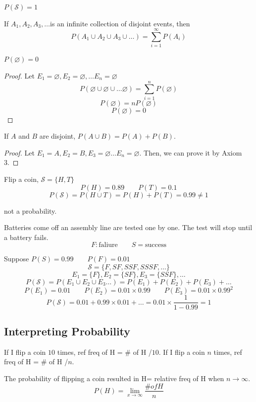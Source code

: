 \begin{axio}
  $P(\mathcal{S})=1$
\end{axio}

\begin{axio}
If $A_1, A_2,A_3,\dots$is an infinite collection of disjoint events, then 
\[  P(A_1 \cup A_2\cup A_3 \cup \dots)=\sum_{i=1}^{\infty}P(A_i)	\]
\end{axio}

\begin{prop}
$P(\varnothing)=0$
\begin{proof}
Let $E_1=\varnothing,E_2=\varnothing,\dots E_n=\varnothing$
\[P(\varnothing \cup \varnothing \cup \dots \varnothing)=\sum_{i=1}^n P(\varnothing)\]
\[P(\varnothing)=nP(\varnothing)\]
\[P(\varnothing)=0\]
\end{proof}
\end{prop}

\begin{prop}
If $A$ and $B$ are disjoint, $P(A \cup B)=P(A)+P(B)$.
\begin{proof}
Let $E_1=A,E_2=B,E_3=\varnothing \dots E_n=\varnothing$. Then, we can prove it by Axiom 3.
\end{proof}
\end{prop}

\begin{exmp}
Flip a coin, $\mathcal{S}=\{H,T\}$
\[P(H)=0.89 \qquad P(T)=0.1\]
\[P(\mathcal{S})=P(H \cup T)=P(H)+P(T)=\boxed{0.99} \neq 1		\]

not a probability.
\end{exmp}

\begin{exmp}
Batteries come off an assembly line are tested one by one. The test will stop until a battery fails.
\[F:\text{faliure} \qquad S=\text{success}\]

Suppose $P(S)=0.99 \qquad P(F)=0.01$
\[\mathcal{S}=\{ F,SF,SSF,SSSF,\dots		\}\]
\[E_1=\{F\},E_2=\{SF\},E_3=\{SSF\},\dots		\]
\[P(\mathcal{S})=P(E_1 \cup E_2 \cup E_3 \dots)=P(E_1)+P(E_2)+P(E_3)+\dots\]
\[P(E_1)=0.01 \qquad P(E_2)=0.01\times0.99 \qquad P(E_3)=0.01\times 0.99^2\]
\[P(\mathcal{S})=0.01+0.99\times0.01+\dots=0.01\times\frac{1}{1-0.99}=1\]
\end{exmp}

\subsection{Interpreting Probability}
\begin{exmp}
If I flip a coin $10$ times, ref freq of H = \# of H /$10$. If I flip a coin $n$ times, ref freq of H = \# of H /$n$.

The probability of flipping a coin resulted in H= relative freq of H when $n\to \infty$. 
\[P(H)=\lim _{x \to \infty} \frac{\# of H}{n}\]
\end{exmp}

